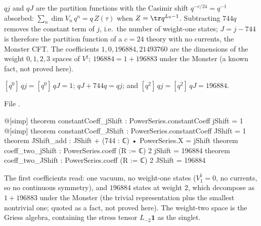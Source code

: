 \begin{physics}
$qj$ and $qJ$ are the partition functions with the Casimir shift $q^{-c/24}=q^{-1}$ absorbed: $\sum_n\dim V_n\,q^{n}=q\,Z(\tau)$ when $Z=\tr q^{L_0-1}$. Subtracting $744q$ removes the constant term of $j$, i.e.\ the number of weight-one states; $J=j-744$ is therefore the partition function of a $c=24$ theory with no currents, the Monster CFT. The coefficients $1,0,196884,21493760$ are the dimensions of the weight $0,1,2,3$ spaces of $V^\natural$; $196884=1+196883$ under the Monster (a known fact, not proved here).
\end{physics}

\begin{proposition}\label{ch05:prop:jcoeffs}
$[q^0]\,qj = [q^0]\,qJ = 1$; $qJ + 744q = qj$; and $[q^2]\,qj = [q^2]\,qJ = 196884$.
\end{proposition}
\noindent File .
\begin{leancode}
@[simp] theorem constantCoeff_jShift : PowerSeries.constantCoeff jShift = 1
@[simp] theorem constantCoeff_JShift : PowerSeries.constantCoeff JShift = 1
theorem JShift_add : JShift + (744 : ℂ) • PowerSeries.X = jShift
theorem coeff_two_jShift : PowerSeries.coeff (R := ℂ) 2 jShift = 196884
theorem coeff_two_JShift : PowerSeries.coeff (R := ℂ) 2 JShift = 196884
\end{leancode}

\begin{physics}
The first coefficients read: one vacuum, no weight-one states ($V^\natural_1=0$, no currents, so no continuous symmetry), and $196884$ states at weight $2$, which decompose as $1+196883$ under the Monster (the trivial representation plus the smallest nontrivial one; quoted as a fact, not proved here). The weight-two space is the Griess algebra, containing the stress tensor $L_{-2}\mathbf 1$ as the singlet.
\end{physics}

